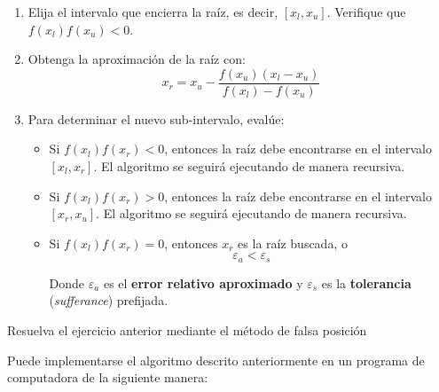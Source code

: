 \begin{enumerate}
	
	\item Elija el intervalo que encierra la raíz, es decir, $[x_l, x_u]$.
		Verifique que $f(x_l)f(x_u) < 0$.

	\item Obtenga la aproximación de la raíz con:
		\begin{equation*}
			x_r = x_u - \frac{f(x_u)(x_l-x_u)}{f(x_l) - f(x_u)}
		\end{equation*}

	\item Para determinar el nuevo sub-intervalo, evalúe:
		\begin{itemize}
			\item Si $f(x_l)f(x_r) < 0$, entonces la raíz debe
				encontrarse en el intervalo $[x_l, x_r]$. El
				algoritmo se seguirá ejecutando de manera
				recursiva.
			\item Si $f(x_l)f(x_r) > 0$, entonces la raíz debe
				encontrarse en el intervalo $[x_r, x_u]$. El
				algoritmo se seguirá ejecutando de manera
				recursiva.

			\item Si $f(x_l) f(x_r) = 0$, entonces $x_r$ es la raíz
				buscada, o
				\[
					\varepsilon_a < \varepsilon_s
				\]

				Donde $\varepsilon_a$ es el \textbf{error relativo
				aproximado} y $\varepsilon_s$ es la
				\textbf{tolerancia} (\textit{sufferance})
				prefijada.
		\end{itemize}
\end{enumerate}

\begin{ex}
	Resuelva el ejercicio anterior mediante el método de falsa posición
	
	\begin{solution}

		Puede implementarse el algoritmo descrito anteriormente en un
		programa de computadora de la siguiente manera:

		

		
	\end{solution}
\end{ex}


